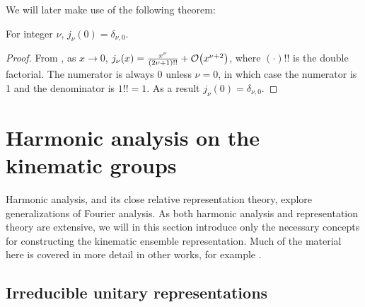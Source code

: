\documentclass[../../main.tex]{subfiles}
\begin{document}
\begin{refsection}
	We will later make use of the following theorem:
	\begin{theorem}\label{sphbessel_zero_delta}
		For integer $\nu$, $j_\nu(0) = \delta_{\nu,0}$.
	\end{theorem}
	\begin{proof}
		From \cite[Eq. 10.53.1]{NIST:DLMF}, as $x \to 0$, $j_\nu(x) = \frac{x^\nu}{(2\nu + 1)!!} + \order{x^{\nu + 2}}$, where $(\cdot)!!$ is the double factorial.
		The numerator is always 0 unless $\nu = 0$, in which case the numerator is 1 and the denominator is $1!! = 1$.
		As a result $j_\nu(0) = \delta_{\nu,0}$.
	\end{proof}

	\section{Harmonic analysis on the kinematic groups}

	Harmonic analysis, and its close relative representation theory, explore generalizations of Fourier analysis.
	As both harmonic analysis and representation theory are extensive, we will in this section introduce only the necessary concepts for constructing the kinematic ensemble representation.
	Much of the material here is covered in more detail in other works, for example \cite[Chapter 8]{chirikjianHarmonicAnalysisEngineers2016}.

	\subsection{Irreducible unitary representations}


\end{refsection}
\end{document}
